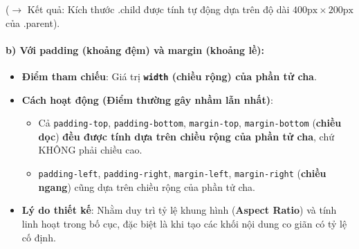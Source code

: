 \documentclass[11pt,oneside]{book}
\newcommand{\codeinline}[1]{\textcolor{accentOrange}{\texttt{#1}}}
\newcommand{\term}[1]{\textbf{\textcolor{primaryBlue}{#1}}}
\begin{document}
\begin{browserWindow}
\par\vspace{4pt}
\textcolor{primaryBlue}{\scriptsize ($\rightarrow$ Kết quả: Kích thước .child được tính tự động dựa trên độ dài $400\text{px} \times 200\text{px}$ của .parent).}
\end{browserWindow}

\paragraph{b) Với padding (khoảng đệm) và margin (khoảng lề):}
\begin{itemize}[leftmargin=1.5em, itemsep=2pt, parsep=0pt]
    \item \textbf{Điểm tham chiếu}: Giá trị \textbf{\codeinline{width} (chiều rộng) của phần tử cha}.
    \item \textbf{Cách hoạt động (Điểm thường gây nhầm lẫn nhất)}:
    \begin{itemize}[leftmargin=1.2em, itemsep=2pt, parsep=0pt]
        \item Cả \codeinline{padding-top}, \codeinline{padding-bottom}, \codeinline{margin-top}, \codeinline{margin-bottom} (\textbf{chiều dọc}) \textbf{đều được tính dựa trên chiều rộng của phần tử cha}, chứ KHÔNG phải chiều cao.
        \item \codeinline{padding-left}, \codeinline{padding-right}, \codeinline{margin-left}, \codeinline{margin-right} (\textbf{chiều ngang}) cũng dựa trên chiều rộng của phần tử cha.
    \end{itemize}
    \item \textbf{Lý do thiết kế}: Nhằm duy trì tỷ lệ khung hình (\term{Aspect Ratio}) và tính linh hoạt trong bố cục, đặc biệt là khi tạo các khối nội dung co giãn có tỷ lệ cố định.
\end{itemize}
\end{document}
